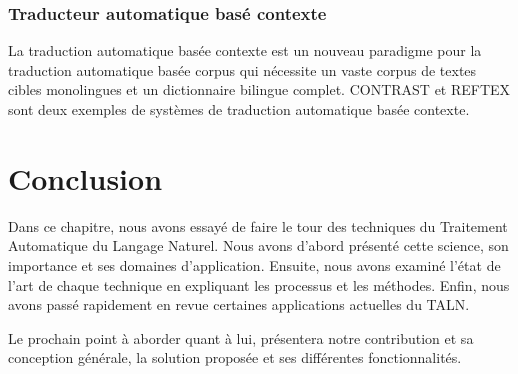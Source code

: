         \subsubsection{Traducteur automatique basé contexte}
        La traduction automatique basée contexte est un nouveau paradigme pour la traduction automatique basée corpus qui nécessite un vaste corpus de textes cibles monolingues et un dictionnaire bilingue complet. CONTRAST \cite{8} et REFTEX \cite{9} sont deux exemples de systèmes de traduction automatique basée contexte.


\section{Conclusion}
Dans ce chapitre, nous avons essayé de faire le tour des techniques du Traitement Automatique du Langage Naturel. Nous avons d'abord présenté cette science, son importance et ses domaines d'application. Ensuite, nous avons examiné l'état de l'art de chaque technique en expliquant les processus et les méthodes. Enfin, nous avons passé rapidement en revue certaines applications actuelles du TALN.

Le prochain point à aborder quant à lui, présentera notre contribution et sa conception générale, la solution proposée et ses différentes fonctionnalités.  